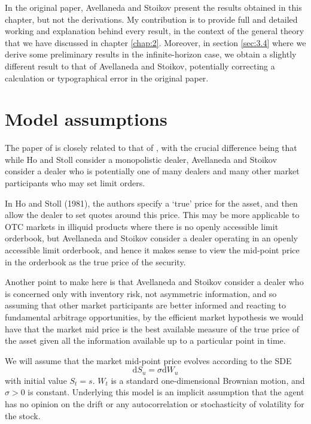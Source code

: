 In the original paper, Avellaneda and Stoikov present the results obtained in this 
chapter, but not the derivations. My contribution is to provide full and detailed 
working and explanation behind every result, in the context of the general theory 
that we have discussed in chapter \ref{chap:2}. Moreover, in section \ref{sec:3.4}
where we derive some preliminary results in the infinite-horizon case, we obtain a 
slightly different result to that of Avellaneda and Stoikov, potentially correcting 
a calculation or typographical error in the original paper.

\section{Model assumptions}\label{sec:3.2}

The paper of \cite{AS2008} is closely related to that of \cite{HS1981}, with the 
crucial difference being that while Ho and Stoll consider a monopolistic dealer,
Avellaneda and Stoikov consider a dealer who is potentially one of many dealers 
and many other market participants who may set limit orders. 

In Ho and Stoll (1981),
the authors specify a `true' price for the asset, and then allow the dealer to set 
quotes around this price. This may be more applicable to OTC markets in illiquid 
products where there is no openly accessible limit orderbook, but Avellaneda and Stoikov
consider a dealer operating in an openly accessible limit orderbook, and hence it makes
sense to view the mid-point price in the orderbook as the true price of the security. 

Another point to make here is that Avellaneda and Stoikov consider a dealer who is 
concerned only with inventory risk, not asymmetric information, and so assuming that
other market participants are better informed and reacting to fundamental arbitrage
opportunities, by the efficient market hypothesis we would have that the market mid
price is the best available measure of the true price of the asset given all the information
available up to a particular point in time.

We will assume that the market mid-point price evolves according to the SDE
\begin{equation}
    \mathrm dS_u=\sigma\mathrm dW_u
\end{equation}
with initial value $S_t=s$. $W_t$ is a standard one-dimensional Brownian motion, and
$\sigma>0$ is constant. Underlying this model is an implicit assumption that the agent
has no opinion on the drift or any autocorrelation or stochasticity of volatility 
for the stock. 

